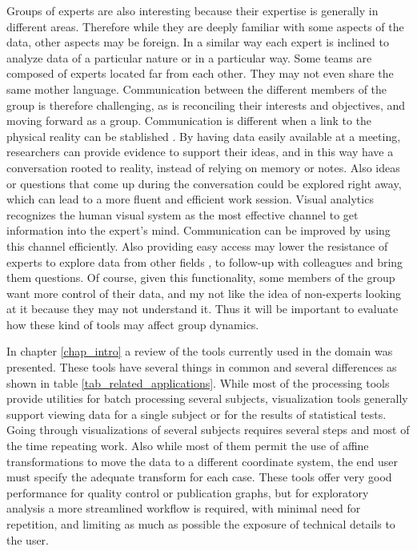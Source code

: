 


Groups of experts are also interesting because their expertise is generally in different areas. Therefore while they are deeply familiar with some aspects of the data, other aspects may be foreign. In a similar way each expert is inclined to analyze data of a particular nature or in a particular way. Some teams are composed of experts located far from each other. They may not even share the same mother language. Communication between the different members of the group is therefore challenging, as is reconciling their interests and objectives, and moving forward as a group. Communication is different when a link to the physical reality can be stablished \autocite{rojas_arredondo_dinamica_2010}. By having data easily available at a meeting, researchers can provide evidence to support their ideas, and in this way have a conversation rooted to reality, instead of relying on memory or notes. Also ideas or questions that come up during the conversation could be explored right away, which can lead to a more fluent and efficient work session. Visual analytics recognizes the human visual system as the most effective channel to get information into the expert's mind. Communication can be improved by using this channel efficiently. Also providing easy access may lower the resistance of experts to explore data from other fields , to follow-up with colleagues and bring them questions. Of course, given this functionality, some members of the group want more control of their data, and my not like the idea of non-experts looking at it because they may not understand it. Thus it will be important to evaluate how these kind of tools may affect group dynamics.


\bigskip

In chapter \ref{chap_intro} a review of the tools currently used in the domain was presented. These tools have several things in common and several differences as shown in table \ref{tab_related_applications}. While most of the processing tools provide utilities for batch processing several subjects, visualization tools generally support viewing data for a single subject or for the results of statistical tests. Going through visualizations of several subjects requires several steps and most of the time repeating work. Also while most of them permit the use of affine transformations to move the data to a different coordinate system, the end user must specify the adequate transform for each case. These tools offer very good performance for quality control or publication graphs, but for exploratory analysis a more streamlined workflow is required, with minimal need for repetition, and limiting as much as possible the exposure of technical details to the user. 

